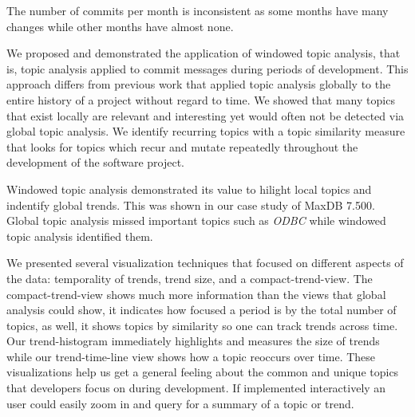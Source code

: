 \documentclass[times, 10pt,twocolumn]{article}
\newcommand{\shrinkit}{\vspace*{-.3em}}
\begin{document}

The number of commits per month is inconsistent as some months have
many changes while other months have almost none.




\shrinkit
{}
\shrinkit








We proposed and demonstrated the application of windowed topic
analysis, that is, topic analysis applied to commit messages during
periods of development. This approach differs from previous work that
applied topic analysis globally to the entire history of a
project without regard to time. We showed that many topics that exist
locally are relevant and interesting yet would often not be detected
via global topic analysis. We identify recurring topics with a topic
similarity measure that looks for topics which recur and mutate
repeatedly throughout the development of the software project.

Windowed topic analysis demonstrated its value to hilight local topics
and indentify global trends. This was shown in our case study of MaxDB
7.500. Global topic analysis missed important topics such as
\emph{ODBC} while windowed topic analysis identified them.


We presented several visualization techniques that focused on
different aspects of the data: temporality of trends, trend size, and
a compact-trend-view. The compact-trend-view shows much more
information than the views that global analysis could show, it
indicates how focused a period is by the total number of topics, as
well, it shows topics by similarity so one can track trends across
time.  Our trend-histogram immediately highlights and measures the
size of trends while our trend-time-line view shows how a topic
reoccurs over time. These visualizations help us get a general feeling
about the common and unique topics that developers focus on during
development. If implemented interactively an user could easily zoom in
and query for a summary of a topic or trend.
\end{document}
